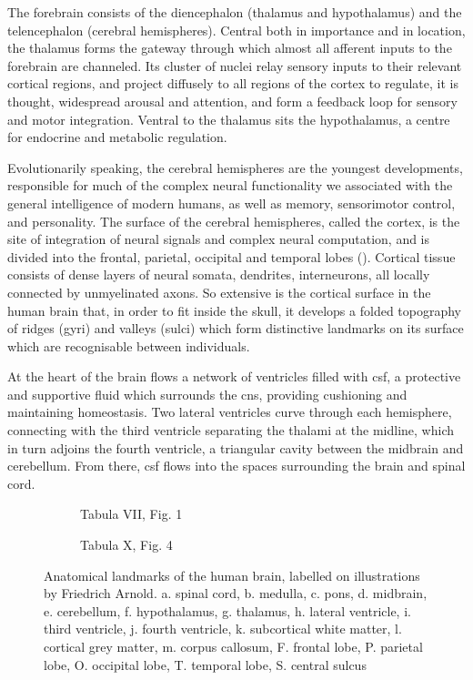 The forebrain consists of the diencephalon (thalamus and hypothalamus) and the telencephalon (cerebral hemispheres).
Central both in importance and in location, the thalamus forms the gateway through which almost all afferent inputs to the forebrain are channeled.
Its cluster of nuclei relay sensory inputs to their relevant cortical regions, and project diffusely to all regions of the cortex to regulate, it is thought, widespread arousal and attention, and form a feedback loop for sensory and motor integration.
Ventral to the thalamus sits the hypothalamus, a centre for endocrine and metabolic regulation.

Evolutionarily speaking, the cerebral hemispheres are the youngest developments, responsible for much of the complex neural functionality we associated with the general intelligence of modern humans, as well as memory, sensorimotor control, and personality.
The surface of the cerebral hemispheres, called the cortex, is the site of integration of neural signals and complex neural computation, and is divided into the frontal, parietal, occipital and temporal lobes ().
Cortical tissue consists of dense layers of neural somata, dendrites, interneurons, all locally connected by unmyelinated axons.
So extensive is the cortical surface in the human brain that, in order to fit inside the skull, it develops a folded topography of ridges (gyri) and valleys (sulci) which form distinctive landmarks on its surface which are recognisable between individuals.

At the heart of the brain flows a network of ventricles filled with \gls{csf}, a protective and supportive fluid which surrounds the \gls{cns}, providing cushioning and maintaining homeostasis.\autocite{Wichmann2022}
Two lateral ventricles curve through each hemisphere, connecting with the third ventricle separating the thalami at the midline, which in turn adjoins the fourth ventricle, a triangular cavity between the midbrain and cerebellum.
From there, \gls{csf} flows into the spaces surrounding the brain and spinal cord.

\begin{figure}[h!]
  \begin{subfigure}[b]{0.5\textwidth}
    
    \caption{Tabula VII, Fig. 1}\label{fig:ardnoldVII1}
  \end{subfigure}%
  \begin{subfigure}[b]{0.5\textwidth}
    
    \caption{Tabula X, Fig. 4}\label{fig:ardnoldX4}
  \end{subfigure}
  \caption{Anatomical landmarks of the human brain, labelled on illustrations by Friedrich Arnold\autocite{Arnold1838}. a. spinal cord, b. medulla, c. pons, d. midbrain, e. cerebellum, f. hypothalamus, g. thalamus, h. lateral ventricle, i. third ventricle, j. fourth ventricle, k. subcortical white matter, l. cortical grey matter, m. corpus callosum, F. frontal lobe, P. parietal lobe, O. occipital lobe, T. temporal lobe, S. central sulcus}
  \label{fig:anat2}
\end{figure}


